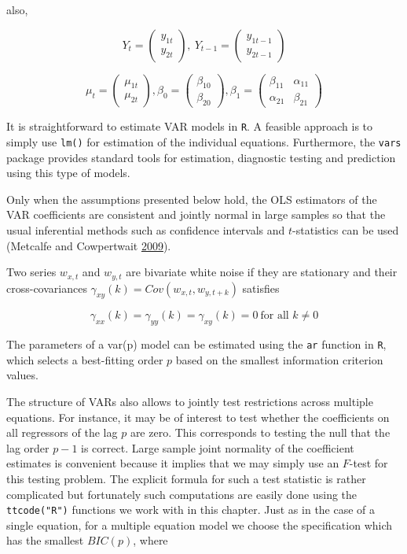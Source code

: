 \documentclass[
  12pt,
]{article}
\begin{document}
also,

\[
Y_t = 
\begin{pmatrix} 
y_{1t} \\
y_{2t}
\end{pmatrix},\ 
Y_{t-1} = 
\begin{pmatrix} 
y_{1t-1} \\
y_{2t-1}
\end{pmatrix}
\]

\[
\mu_t = 
\begin{pmatrix} 
\mu_{1t} \\
\mu_{2t}
\end{pmatrix},
\beta_{0} = 
\begin{pmatrix} 
\beta_{10} \\
\beta_{20}
\end{pmatrix},
\beta_{1} = 
\begin{pmatrix} 
\beta_{11} & \alpha_{11} \\
\alpha_{21} & \beta_{21}
\end{pmatrix}
\]

It is straightforward to estimate VAR models in \texttt{R}. A feasible approach is to simply use \texttt{lm()} for estimation of the individual equations. Furthermore, the \texttt{vars} package provides standard tools for estimation, diagnostic testing and prediction using this type of models.

Only when the assumptions presented below hold, the OLS estimators of the VAR coefficients are consistent and jointly normal in large samples so that the usual inferential methods such as confidence intervals and \(t\)-statistics can be used (Metcalfe and Cowpertwait \protect\hyperlink{ref-metcalfe2009introductory}{2009}).

Two series \(w_{x,t}\) and \(w_{y,t}\) are bivariate white noise if they are stationary and their cross-covariances \(\gamma_{xy}(k) = Cov(w_{x,t}, w_{y, t+k})\) satisfies

\[
\gamma_{xx}(k) = \gamma_{yy}(k) = \gamma_{xy}(k) = 0\ \text{for all } k \neq 0
\]

The parameters of a var(p) model can be estimated using the \texttt{ar} function in \texttt{R}, which selects a best-fitting order \(p\) based on the smallest information criterion values.

The structure of VARs also allows to jointly test restrictions across multiple equations. For instance, it may be of interest to test whether the coefficients on all regressors of the lag \(p\) are zero. This corresponds to testing the null that the lag order \(p-1\) is correct. Large sample joint normality of the coefficient estimates is convenient because it implies that we may simply use an \(F\)-test for this testing problem. The explicit formula for such a test statistic is rather complicated but fortunately such computations are easily done using the \texttt{ttcode("R")} functions we work with in this chapter. Just as in the case of a single equation, for a multiple equation model we choose the specification which has the smallest \(BIC(p)\), where
\end{document}
